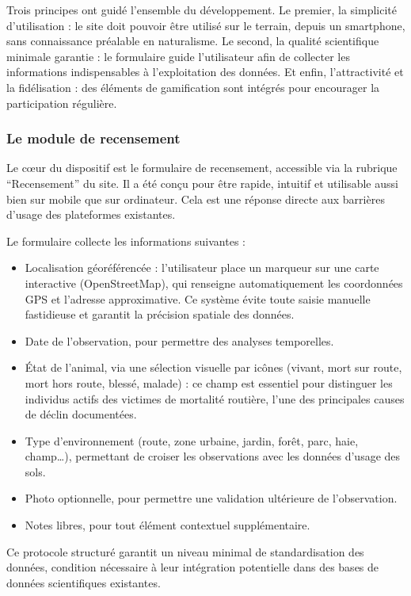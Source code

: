 \documentclass[a4paper,11pt]{article}
\begin{document}
Trois principes ont guidé l’ensemble du développement. Le premier, la simplicité d’utilisation : le site doit pouvoir être utilisé sur le terrain, depuis un smartphone, sans connaissance préalable en naturalisme. Le second, la qualité scientifique minimale garantie : le formulaire guide l’utilisateur afin de collecter les informations indispensables à l’exploitation des données. Et enfin, l'attractivité et la fidélisation : des éléments de gamification sont intégrés pour encourager la participation régulière.

\subsubsection{Le module de recensement}

Le c\oe ur du dispositif est le formulaire de recensement, accessible via la rubrique \enquote{Recensement} du site. Il a été conçu pour être rapide, intuitif et utilisable aussi bien sur mobile que sur ordinateur. Cela est une réponse directe aux barrières d'usage des plateformes existantes.

Le formulaire collecte les informations suivantes :
\begin{itemize}
    \item Localisation géoréférencée : l'utilisateur place un marqueur sur une carte interactive (OpenStreetMap), qui renseigne automatiquement les coordonnées GPS et l'adresse approximative. Ce système évite toute saisie manuelle fastidieuse et garantit la précision spatiale des données.
    \item Date de l'observation, pour permettre des analyses temporelles.
    \item État de l'animal, via une sélection visuelle par icônes (vivant, mort sur route, mort hors route, blessé, malade) : ce champ est essentiel pour distinguer les individus actifs des victimes de mortalité routière, l'une des principales causes de déclin documentées.
    \item Type d'environnement (route, zone urbaine, jardin, forêt, parc, haie, champ…), permettant de croiser les observations avec les données d'usage des sols.
    \item Photo optionnelle, pour permettre une validation ultérieure de l'observation.
    \item Notes libres, pour tout élément contextuel supplémentaire.
\end{itemize}

Ce protocole structuré garantit un niveau minimal de standardisation des données, condition nécessaire à leur intégration potentielle dans des bases de données scientifiques existantes.
\end{document}
